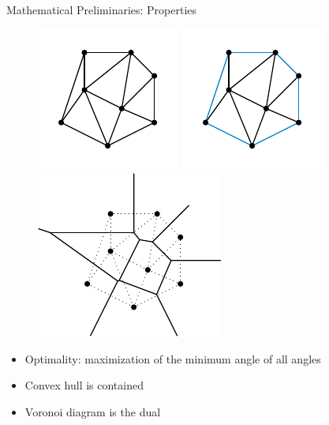 \documentclass[aspectratio=169,fleqn]{beamer}
\begin{document}
  \begin{frame}{Mathematical Preliminaries: Properties}
    \begin{figure}
      \center
      \includegraphics[scale=1.3]{figures/delaunay-triangulation.pdf}
      \includegraphics[scale=1.3]{figures/delaunay-triangulation-convex-hull.pdf}
      \includegraphics[scale=1.3]{figures/delaunay-triangulation-voronoi.pdf}
    \end{figure}
    \begin{itemize}
      \item Optimality: maximization of the minimum angle of all angles
      \item Convex hull is contained
      \item Voronoi diagram is the dual
    \end{itemize}
  \end{frame}
\end{document}
